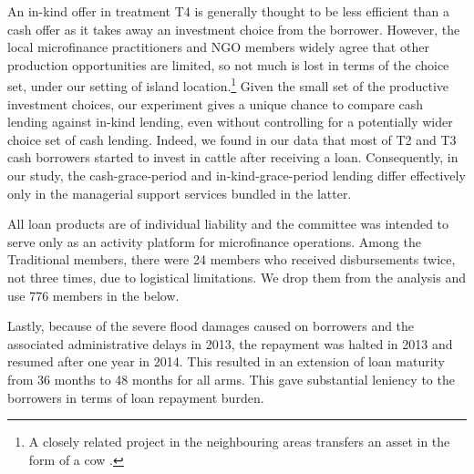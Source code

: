 	An in-kind offer in treatment \textsf{T4} is generally thought to be less efficient than a cash offer as it takes away an investment choice from the borrower. However, the local microfinance practitioners and NGO members widely agree that other production opportunities are limited, so not much is lost in terms of the choice set, under our setting of island location.\footnote{A closely related project in the neighbouring areas transfers an asset in the form of a cow \citep{BandieraBRAC2017}. }  Given the small set of the productive investment choices, our experiment gives a unique chance to compare cash lending against in-kind lending, even without controlling for a potentially wider choice set of cash lending. 
	Indeed, we found in our data that most of \textsf{T2} and \textsf{T3} cash borrowers started to invest in cattle after receiving a loan. Consequently, in our study, the cash-grace-period and in-kind-grace-period lending differ effectively only in the managerial support services bundled in the latter. 

	All loan products are of individual liability and the committee was intended to serve only as an activity platform for microfinance operations. Among the \textsf{Traditional} members, there were 24 members who received disbursements twice, not three times, due to logistical limitations. We drop them from the analysis and use 776 members in the below. %

	Lastly, because of the severe flood damages caused on borrowers and the associated administrative delays in 2013, the repayment was halted in 2013 and resumed after one year in 2014. This resulted in an extension of loan maturity from 36 months to 48 months for all arms. This gave substantial leniency to the borrowers in terms of loan repayment burden. 

